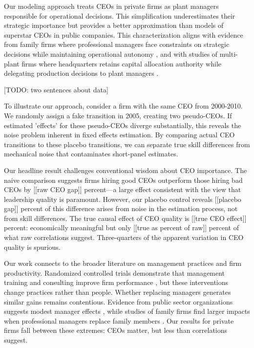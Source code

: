 \documentclass[11pt,a4paper]{article}
\begin{document}
Our modeling approach treats CEOs in private firms as plant managers responsible for operational decisions. This simplification underestimates their strategic importance but provides a better approximation than models of superstar CEOs in public companies. This characterization aligns with evidence from family firms where professional managers face constraints on strategic decisions while maintaining operational autonomy \citep{zellweger2012managing}, and with studies of multi-plant firms where headquarters retains capital allocation authority while delegating production decisions to plant managers \citep{bloom2012americans}.

[TODO: two sentences about data]

To illustrate our approach, consider a firm with the same CEO from 2000-2010. We randomly assign a fake transition in 2005, creating two pseudo-CEOs. If estimated 'effects' for these pseudo-CEOs diverge substantially, this reveals the noise problem inherent in fixed effects estimation. By comparing actual CEO transitions to these placebo transitions, we can separate true skill differences from mechanical noise that contaminates short-panel estimates.

Our headline result challenges conventional wisdom about CEO importance. The naive comparison suggests firms hiring good CEOs outperform those hiring bad CEOs by [[raw CEO gap]] percent—a large effect consistent with the view that leadership quality is paramount. However, our placebo control reveals [[placebo gap]] percent of this difference arises from noise in the estimation process, not from skill differences. The true causal effect of CEO quality is [[true CEO effect]] percent: economically meaningful but only [[true as percent of raw]] percent of what raw correlations suggest. Three-quarters of the apparent variation in CEO quality is spurious.

Our work connects to the broader literature on management practices and firm productivity. Randomized controlled trials demonstrate that management training and consulting improve firm performance \citep{bloom2013does}, but these interventions change practices rather than people. Whether replacing managers generates similar gains remains contentious. Evidence from public sector organizations suggests modest manager effects \citep{fenizia2022managers, janke2024role}, while studies of family firms find larger impacts when professional managers replace family members \citep{bennedsen2007inside}. Our results for private firms fall between these extremes: CEOs matter, but less than correlations suggest.
\end{document}
